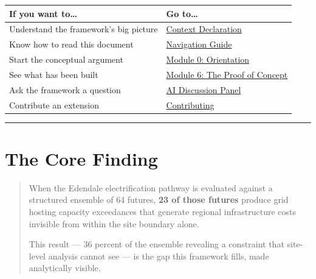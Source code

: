 \documentclass[
  11pt,
  a4paper,
  twoside,
  openright]{scrbook}
\newcounter{none} %
\begin{document}
{\def\LTcaptype{none} %
\begin{longtable}[]{@{}
  >{\raggedright\arraybackslash}p{}
  >{\raggedright\arraybackslash}p{}@{}}
\toprule\noalign{}
\begin{minipage}[b]{\linewidth}\raggedright
If you want to\ldots{}
\end{minipage} & \begin{minipage}[b]{\linewidth}\raggedright
Go to\ldots{}
\end{minipage} \\
\midrule\noalign{}
\endhead
\bottomrule\noalign{}
\endlastfoot
Understand the framework's big picture &
\href{front-matter/context-declaration.qmd}{Context Declaration} \\
Know how to read this document &
\href{front-matter/navigation-guide.qmd}{Navigation Guide} \\
Start the conceptual argument &
\href{manuscript/module-0-orientation.qmd}{Module 0: Orientation} \\
See what has been built & \href{manuscript/module-6-poc.qmd}{Module 6:
The Proof of Concept} \\
Ask the framework a question & \hyperref[ai-panel]{AI Discussion
Panel} \\
Contribute an extension & \href{../CONTRIBUTING.md}{Contributing} \\
\end{longtable}
}

\begin{center}\rule{0.5\linewidth}{0.5pt}\end{center}

\section*{The Core Finding}\label{the-core-finding}


\begin{quote}
When the Edendale electrification pathway is evaluated against a
structured ensemble of 64 futures, \textbf{23 of those futures} produce
grid hosting capacity exceedances that generate regional infrastructure
costs invisible from within the site boundary alone.

This result --- 36 percent of the ensemble revealing a constraint that
site-level analysis cannot see --- is the gap this framework fills, made
analytically visible.
\end{quote}
\end{document}
